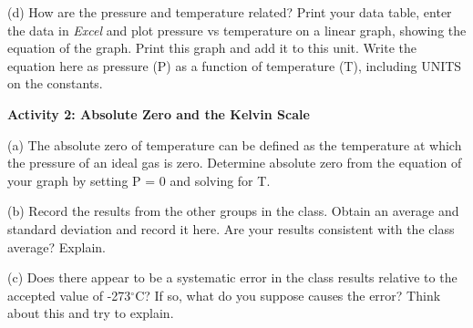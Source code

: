(d) How are the pressure and temperature related?  Print your data table, enter the data in \textit{Excel} and plot pressure vs temperature on a linear graph, showing the equation of the graph.  Print this graph and add it to this unit. Write the equation here as pressure (P) as a function of temperature (T), including UNITS on the constants.
\vspace{15mm}



\textbf{Activity 2: Absolute Zero and the Kelvin Scale}

(a) The absolute zero of temperature can be defined as the temperature
at which the pressure of an ideal gas is zero. Determine absolute
zero from the equation of your graph by setting P = 0 and solving for T.
\vspace{25mm}

(b) Record the results from the other groups in the class. 
Obtain an average and standard deviation and record it here.
Are your results consistent with the class average?  Explain.
\vspace{25mm}

(c) Does there appear to be a systematic error in the class results relative 
to the accepted value of -273\( ^{\circ } \)C?  If so, what do you suppose 
causes the error? Think about this and try to explain.



